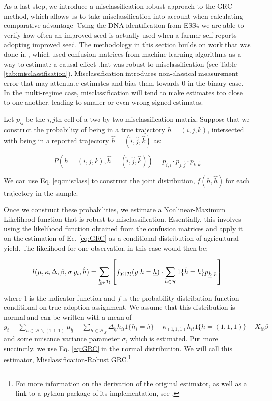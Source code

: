 \documentclass[11pt]{article}
\begin{document}
As a last step, we introduce a misclassification-robust approach to the GRC method, which allows us to take misclassification into account when calculating comparative advantage. Using the DNA identification from ESS4 we are able to verify how often an improved seed is actually used when a farmer self-reports adopting improved seed. The methodology in this section builds on work that was done in \cite{michuda2021three}, which used confusion matrices from machine learning algorithms as a way to estimate a causal effect that was robust to misclassification (see Table \ref{tab:misclassification}). Misclassification introduces non-classical measurement error that may attenuate estimates and bias them towards 0 in the binary case. In the multi-regime case, misclassification will tend to make estimates too close to one another, leading to smaller or even wrong-signed estimates.

Let $p_{ij}$ be the $i,j$th cell of a two by two misclassification matrix. Suppose that we construct the probability of being in a true trajectory $h = (i,j,k)$, intersected with being in a reported trajectory $\hat{h} = (\hat{i},\hat{j}, \hat{k})$ as:

\begin{equation}
\label{eq:misclass}
P(h = (i,j,k) , \hat{h} = (\hat{i},\hat{j}, \hat{k})) = p_{i, \hat{i}}\cdot p_{j, \hat{j}}\cdot p_{k, \hat{k}}
\end{equation}

We can use Eq. \ref{eq:misclass} to construct the joint distribution, $f(h, \hat{h})$ for each trajectory in the sample. 

Once we construct these probabilities, we estimate a Nonlinear-Maximum Likelihood function that is robust to misclassification. Essentially, this involves using the likelihood function obtained from the confusion matrices and apply it on the estimation of Eq. \ref{eq:GRC} as a conditional distribution of agricultural yield. The likelihood for one observation in this case would then be:

\begin{equation}
\label{eq:mr-grc}
l(\mu, \kappa, \Delta, \beta, \sigma|y_{t}, \hat{h}) = \sum_{\underbar{$h$}\in\mathcal{H}} \left[ f_{Y_{t}| \mathcal{H}}(y|h=\underbar{$h$})\cdot  \sum_{\bar{h} \in \mathcal{H}} 1\{\hat{h}=\bar{h}\} p_{\underbar{$h$}, \bar{h}} \right]
\end{equation}

\noindent where $1$ is the indicator function and $f$ is the probability distribution function conditional on true adoption assignment. We assume that this distribution is normal and can be written with a mean of $y_t - \sum_{\underline{h}\in\mathcal{H}\backslash (1,1,1)}\mu_{\underline{h}}-\sum_{\underline{h}\in\mathcal{H}_{S}}\Delta_{\underline{h}}h_{it}1\{h_{i}=\underline{h}\} - \kappa_{(1,1,1)}h_{it}1\{\underline{h}=(1,1,1)\}- X_{it}\beta$ and some nuisance variance parameter $\sigma$, which is estimated. Put more succinctly, we use Eq. \ref{eq:GRC} in the normal distribution. We will call this estimator, Misclassification-Robust GRC.\footnote{For more information on the derivation of the original estimator, as well as a link to a python package of its implementation, see \cite{michuda2021three}.}
\end{document}
